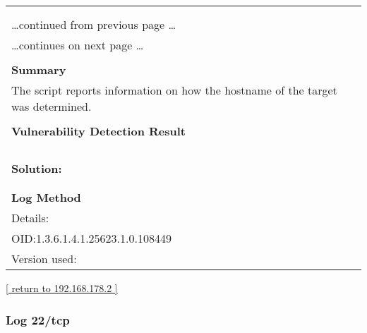 \documentclass{article}
\begin{document}
\begin{longtable}{|p{}|}
\hline
\rowcolor{gvm_log}{\color{white}{Log (CVSS: 0.0) }}\\
\rowcolor{gvm_log}{\color{white}{NVT: Hostname Determination Reporting}}\\
\hline
\endfirsthead
\hfill\ldots continued from previous page \ldots \\
\hline
\endhead
\hline
\ldots continues on next page \ldots \\
\endfoot
\hline
\endlastfoot
\\
\textbf{Summary}\\
The script reports information on how the hostname
  of the target was determined.\\

        \hline
        \\
\textbf{Vulnerability Detection Result}\\
\rowcolor{white}{\verb=Hostname determination for IP 192.168.178.2:=}\\
\rowcolor{white}{\verb=Hostname|Source=}\\
\rowcolor{white}{\verb=gvm.fritz.box|Reverse-DNS=}\\

          \hline
          \\
\textbf{Solution:}\\
\\


        \hline
        \\
\textbf{Log Method}\\
Details:
\rowcolor{white}{\verb=Hostname Determination Reporting=}\\
OID:1.3.6.1.4.1.25623.1.0.108449\\
Version used:
\rowcolor{white}{\verb=2018-11-19T11:11:31Z=}\\
\end{longtable}

\begin{footnotesize}\hyperref[host:192.168.178.2]{[ return to 192.168.178.2 ]}\end{footnotesize}
\subsubsection{Log 22/tcp}
\label{port:192.168.178.2 22/tcp Log}
\end{document}
